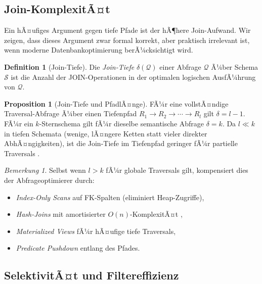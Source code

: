 ﻿\documentclass[a4paper,12pt]{report}
\theoremstyle{definition}
\newtheorem{definition}{Definition}[chapter]
\newtheorem{proposition}[theorem]{Proposition}
\theoremstyle{remark}
\newtheorem{remark}{Bemerkung}[chapter]
\begin{document}
\subsection{Join-KomplexitÃ¤t}

Ein hÃ¤ufiges Argument gegen tiefe Pfade ist der hÃ¶here Join-Aufwand.
Wir zeigen, dass dieses Argument zwar formal korrekt, aber praktisch
irrelevant ist, wenn moderne Datenbankoptimierung berÃ¼cksichtigt wird.

\begin{definition}[Join-Tiefe]
Die \emph{Join-Tiefe} $\delta(\mathcal{Q})$ einer Abfrage $\mathcal{Q}$ Ã¼ber
Schema $\mathcal{S}$ ist die Anzahl der JOIN-Operationen in der optimalen
logischen AusfÃ¼hrung von $\mathcal{Q}$.
\end{definition}

\begin{proposition}[Join-Tiefe und PfadlÃ¤nge]
\label{prop:jointiefe}
FÃ¼r eine vollstÃ¤ndige Traversal-Abfrage Ã¼ber einen Tiefenpfad
$R_1 \to R_2 \to \cdots \to R_l$ gilt $\delta = l - 1$.
FÃ¼r ein $k$-Sternschema gilt fÃ¼r dieselbe semantische Abfrage $\delta = k$.
Da $l \ll k$ in tiefen Schemata (wenige, lÃ¤ngere Ketten statt vieler
direkter AbhÃ¤ngigkeiten), ist die Join-Tiefe im Tiefenpfad geringer
fÃ¼r partielle Traversals \cite{Ramakrishnan2003}.
\end{proposition}

\begin{remark}
Selbst wenn $l > k$ fÃ¼r globale Traversals gilt, kompensiert dies der
Abfrageoptimierer durch:
\begin{itemize}
  \item \emph{Index-Only Scans} auf FK-Spalten (eliminiert Heap-Zugriffe),
  \item \emph{Hash-Joins} mit amortisierter $O(n)$-KomplexitÃ¤t \cite{Graefe1993},
  \item \emph{Materialized Views} fÃ¼r hÃ¤ufige tiefe Traversals,
  \item \emph{Predicate Pushdown} entlang des Pfades.
\end{itemize}
\end{remark}

\subsection{SelektivitÃ¤t und Filtereffizienz}
\end{document}
